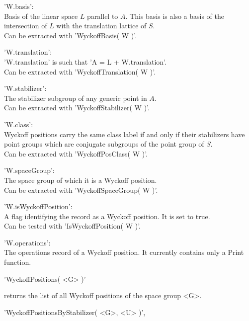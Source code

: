      'W.basis': \\
          Basis of the linear space $L$  parallel to $A.$  This basis is 
          also a basis of the  intersection of $L$ with  the translation 
          lattice of $S$. \\
          Can be extracted with 'WyckoffBasis( W )'.

     'W.translation': \\  
          'W.translation' is such that 'A = L + W.translation'. \\
          Can be extracted with 'WyckoffTranslation( W )'.

     'W.stabilizer': \\   
          The stabilizer subgroup of any generic point in $A.$ \\
          Can be extracted with 'WyckoffStabilizer( W )'.

     'W.class': \\      
          Wyckoff  positions  carry  the same  class label  if and  only
          if their  stabilizers have  point groups  which  are conjugate 
          subgroups of the point group of $S.$ \\
          Can be extracted with 'WyckoffPosClass( W )'.

     'W.spaceGroup': \\      
          The space group of which it is a Wyckoff position. \\
          Can be extracted with 'WyckoffSpaceGroup( W )'.


     'W.isWyckoffPosition': \\
          A flag identifying the record as a Wyckoff position.  It is set
          to true.\\ 
          Can be tested with 'IsWyckoffPosition( W )'.

     'W.operations': \\
          The  operations  record  of  a Wyckoff  position.  It currently
          contains only a Print function. 


'WyckoffPositions( <G> )'

returns the  list of all  Wyckoff positions  of the  space group  <G>.


'WyckoffPositionsByStabilizer( <G>, <U> )',

